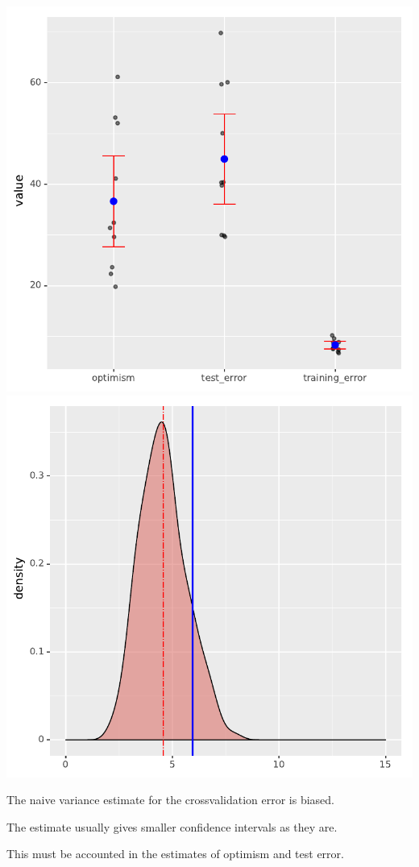 \documentclass[landscape,footrule]{foils}
\begin{document}
\centerline{
\includegraphics[scale=0.8]{crossvalidation_moment_matching}\hspace*{0.5cm}
\includegraphics[scale=0.8]{crossvalidation_variance_estimate}}
\vspace*{-.5cm}
\begin{triangles}
\item The naive variance estimate for the crossvalidation error is biased.   
\item The estimate usually gives smaller confidence intervals as they are.  
\item This must be accounted in the estimates of optimism and test error. 
\end{triangles}
\end{document}
